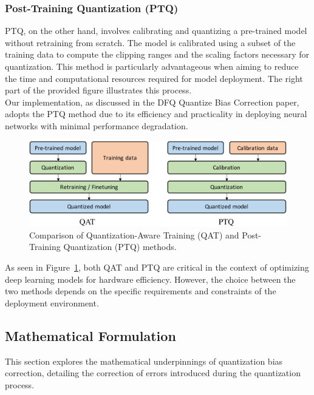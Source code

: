 \documentclass[10pt]{article}
\begin{document}
\subsubsection{Post-Training Quantization (PTQ)}
PTQ, on the other hand, involves calibrating and quantizing a pre-trained model without retraining from scratch. The model is calibrated using a subset of the training data to compute the clipping ranges and the scaling factors necessary for quantization. This method is particularly advantageous when aiming to reduce the time and computational resources required for model deployment. The right part of the provided figure illustrates this process.\\

Our implementation, as discussed in the DFQ Quantize Bias Correction paper, adopts the PTQ method due to its efficiency and practicality in deploying neural networks with minimal performance degradation.

\begin{figure}[H]
\centering
\includegraphics[width=\textwidth]{figures/qat_ptq.png}
\caption{Comparison of Quantization-Aware Training (QAT) and Post-Training Quantization (PTQ) methods.}
\label{fig:qat_ptq_comparison}
\end{figure}

As seen in Figure~\ref{fig:qat_ptq_comparison}, both QAT and PTQ are critical in the context of optimizing deep learning models for hardware efficiency. However, the choice between the two methods depends on the specific requirements and constraints of the deployment environment.




\subsection{Mathematical Formulation}
This section explores the mathematical underpinnings of quantization bias correction, detailing the correction of errors introduced during the quantization process.
\end{document}
